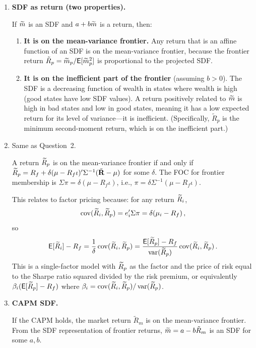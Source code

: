 \begin{enumerate}
\item \textbf{SDF as return (two properties).}

If $\widetilde{m}$ is an SDF and $a + b\widetilde{m}$ is a return, then:

\begin{enumerate}
\item[(i)] \textbf{It is on the mean-variance frontier.}  Any return that is an affine function of an SDF is on the mean-variance frontier, because the frontier return $\tilde{R}_p = \widetilde{m}_p/\mathsf{E}[\widetilde{m}_p^2]$ is proportional to the projected SDF.

\item[(ii)] \textbf{It is on the inefficient part of the frontier} (assuming $b>0$).  The SDF is a decreasing function of wealth in states where wealth is high (good states have low SDF values).  A return positively related to $\widetilde{m}$ is high in bad states and low in good states, meaning it has a low expected return for its level of variance---it is inefficient.  (Specifically, $\tilde{R}_p$ is the minimum second-moment return, which is on the inefficient part.)
\end{enumerate}

\item Same as Question~2.

A return $\widetilde{R}_p$ is on the mean-variance frontier if and only if $\widetilde{R}_p = R_f + \delta(\mu-R_f\iota)'\Sigma^{-1}(\tilde{\mathbf{R}}-\mu)$ for some $\delta$.  The FOC for frontier membership is $\Sigma\pi = \delta(\mu-R_f\iota)$, i.e., $\pi = \delta\Sigma^{-1}(\mu-R_f\iota)$.

This relates to factor pricing because: for any return $\widetilde{R}_i$,
\[
\operatorname{cov}(\widetilde{R}_i,\widetilde{R}_p) = e_i'\Sigma\pi = \delta(\mu_i-R_f)\,,
\]
so
\[
\mathsf{E}[\widetilde{R}_i] - R_f = \frac{1}{\delta}\operatorname{cov}(\widetilde{R}_i,\widetilde{R}_p) = \frac{\mathsf{E}[\widetilde{R}_p]-R_f}{\operatorname{var}(\widetilde{R}_p)}\operatorname{cov}(\widetilde{R}_i,\widetilde{R}_p)\,.
\]
This is a single-factor model with $\widetilde{R}_p$ as the factor and the price of risk equal to the Sharpe ratio squared divided by the risk premium, or equivalently $\beta_i(\mathsf{E}[\widetilde{R}_p]-R_f)$ where $\beta_i = \operatorname{cov}(\widetilde{R}_i,\widetilde{R}_p)/\operatorname{var}(\widetilde{R}_p)$.

\item \textbf{CAPM SDF.}

If the CAPM holds, the market return $\tilde{R}_m$ is on the mean-variance frontier.  From the SDF representation of frontier returns, $\widetilde{m} = a - b\tilde{R}_m$ is an SDF for some $a,b$.


\end{enumerate}
